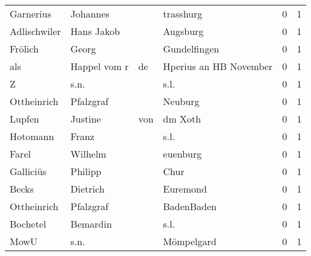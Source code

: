 \begin{tabular}{llllrr}
                Garnerius &                           Johannes &             &                                   trasshurg &          0 &         1 \\
             Adlischwiler &                         Hans Jakob &             &                                    Augsburg &          0 &         1 \\
                  Frölich &                              Georg &             &                                Gundelfingen &          0 &         1 \\
                      als &                       Happel vom r &          de &                      Hperius an HB November &          0 &         1 \\
                        Z &                               s.n. &             &                                        s.l. &          0 &         1 \\
              Ottheinrich &                          Pfalzgraf &             &                                     Neuburg &          0 &         1 \\
                   Lupfen &                            Justine &         von &                                     dm Xoth &          0 &         1 \\
                 Hotomann &                              Franz &             &                                        s.l. &          0 &         1 \\
                    Farel &                            Wilhelm &             &                                    euenburg &          0 &         1 \\
                Galliciüs &                            Philipp &             &                                        Chur &          0 &         1 \\
                    Becks &                           Dietrich &             &                                    Euremond &          0 &         1 \\
              Ottheinrich &                          Pfalzgraf &             &                                  BadenBaden &          0 &         1 \\
                 Bochetel &                           Bemardin &             &                                        s.l. &          0 &         1 \\
                     MowU &                               s.n. &             &                                  Mömpelgard &          0 &         1 \\

\end{tabular}
